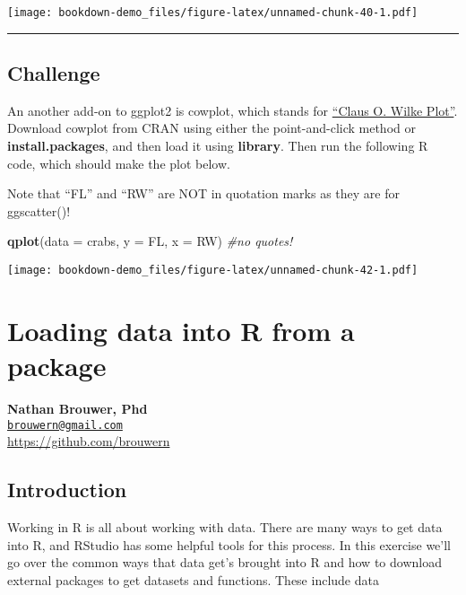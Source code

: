 \documentclass[]{book}
\newenvironment{Shaded}{\begin{snugshade}}{\end{snugshade}}
\newcommand{\KeywordTok}[1]{\textcolor[rgb]{0.13,0.29,0.53}{\textbf{#1}}}
\newcommand{\DataTypeTok}[1]{\textcolor[rgb]{0.13,0.29,0.53}{#1}}
\newcommand{\CommentTok}[1]{\textcolor[rgb]{0.56,0.35,0.01}{\textit{#1}}}
\newcommand{\NormalTok}[1]{#1}
\theoremstyle{definition}
\theoremstyle{definition}
\theoremstyle{definition}
\theoremstyle{remark}
\begin{document}
\texttt{[image: bookdown-demo\_files/figure-latex/unnamed-chunk-40-1.pdf]}

\begin{center}\rule{0.5\linewidth}{\linethickness}\end{center}

\section{Challenge}\label{challenge}

An another add-on to ggplot2 is cowplot, which stands for
\href{https://cran.r-project.org/web/packages/cowplot/vignettes/introduction.html}{``Claus
O. Wilke Plot''}. Download cowplot from CRAN using either the
point-and-click method or \textbf{install.packages}, and then load it
using \textbf{library}. Then run the following R code, which should make
the plot below.

Note that ``FL'' and ``RW'' are NOT in quotation marks as they are for
ggscatter()!

\begin{Shaded}
\begin{Highlighting}[]
\KeywordTok{qplot}\NormalTok{(}\DataTypeTok{data =}\NormalTok{ crabs, }\DataTypeTok{y =}\NormalTok{ FL, }\DataTypeTok{x =}\NormalTok{ RW) }\CommentTok{#no quotes!}
\end{Highlighting}
\end{Shaded}

\texttt{[image: bookdown-demo\_files/figure-latex/unnamed-chunk-42-1.pdf]}

\chapter{Loading data into R from a
package}\label{loading-data-into-r-from-a-package}

\textbf{Nathan Brouwer, Phd}\\
\href{mailto:brouwern@gmail.com}{\nolinkurl{brouwern@gmail.com}}\\
\url{https://github.com/brouwern}

\section{Introduction}\label{introduction-1}

Working in R is all about working with data. There are many ways to get
data into R, and RStudio has some helpful tools for this process. In
this exercise we'll go over the common ways that data get's brought into
R and how to download external packages to get datasets and functions.
These include data
\end{document}
